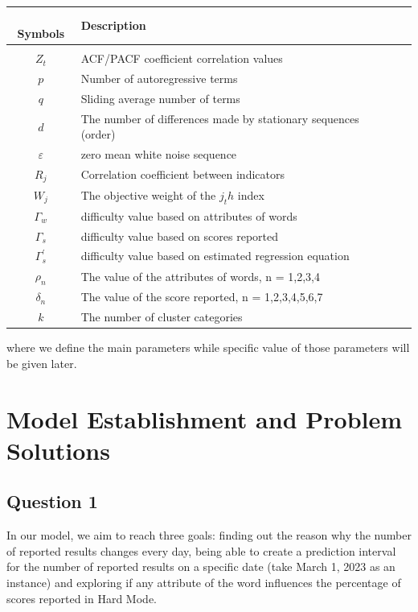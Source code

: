 \documentclass{mcmthesis}
\begin{document}
\begin{center}
\begin{tabular}{clc}
~
{\bf Symbols} & {\bf Description} \\[0.25cm]
\hline 
\\
$Z_t$ & ACF/PACF coefficient correlation values & ~ \\[0.2cm]
$p$ & Number of autoregressive terms \\[0.2cm]
$q$ & Sliding average number of terms  \\[0.2cm]
$d$ & The number of differences made by stationary sequences (order)  \\[0.2cm]
$\varepsilon$ & zero mean white noise sequence \\[0.2cm]
$R_j$ & Correlation coefficient between indicators \\[0.2cm]
$W_j$ & The objective weight of the $j_th$ index \\[0.2cm]
$\varGamma_w $ & difficulty value based on attributes of words \\[0.2cm]
$\varGamma_s $ & difficulty value based on scores reported\\[0.2cm]
$\varGamma_s^{'}$ & difficulty value based on estimated regression equation \\[0.2cm]
$\rho_n $ & The value of the attributes of words, n = 1,2,3,4  \\[0.2cm]
$\delta_n $ & The value of the score reported, n = 1,2,3,4,5,6,7  \\[0.2cm]
$k$ & The number of cluster categories \\[0.2cm]
\hline
\end{tabular}
\end{center}

\noindent where we define the main parameters while specific value of those parameters will be given later.

\section{Model Establishment and Problem Solutions}

\subsection{Question 1}

In our model, we aim to reach three goals: finding out the reason why the number of reported results changes every day, being able to create a prediction interval for the number of reported results on a specific date (take March 1, 2023 as an instance) and exploring if any attribute of the word influences the percentage of scores reported in Hard Mode. 
\end{document}
